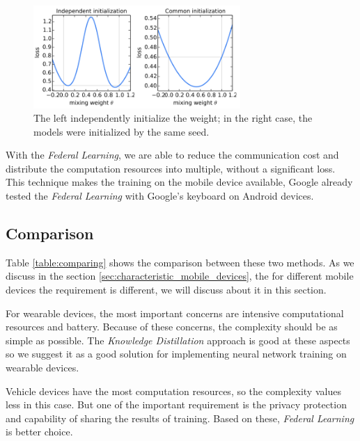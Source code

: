 \documentclass[article]{aaltoseries}
\begin{document}
\begin{figure}[t!]
  \begin{center}
    \includegraphics[width=0.7\textwidth]{figures/share_weight}
    \caption{The left independently initialize the weight; in the right case, the models were initialized by the same seed.}
    \label{fig:share_weight}
  \end{center}
\end{figure}

With the \emph{Federal Learning}, we are able to reduce the communication cost and distribute the computation resources into multiple,
without a significant loss.
This technique makes the training on the mobile device available, Google already tested the \emph{Federal Learning} with Google's keyboard
on Android devices\cite{BrendanMcMahanandDanielRamage2017}.


\subsection{Comparison}

Table \ref{table:comparing} shows the comparison between these two methods. 
As we discuss in the section \ref{sec:characteristic_mobile_devices}, 
the for different mobile devices the requirement is different, we will discuss about it in this section.

For wearable devices, the most important concerns are intensive computational resources and battery. 
Because of these concerns, the complexity should be as simple as possible. 
The \emph{Knowledge Distillation} approach is good at these aspects so we suggest it as a good solution for 
implementing neural network training on wearable devices.

Vehicle devices have the most computation resources, so the complexity values less in this case.
But one of the important requirement is the privacy protection and capability of sharing the results
of training. Based on these, \emph{Federal Learning} is better choice.
\end{document}
